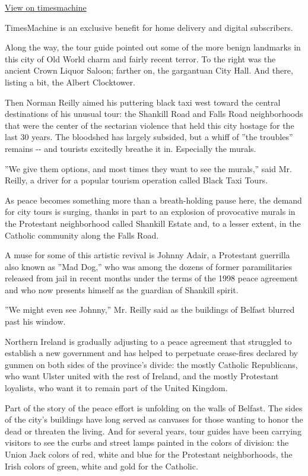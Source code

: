 \href{http://timesmachine.nytimes.com/timesmachine/2000/08/12/640697.html}{View
on timesmachine}

TimesMachine is an exclusive benefit for home delivery and digital
subscribers.

Along the way, the tour guide pointed out some of the more benign
landmarks in this city of Old World charm and fairly recent terror. To
the right was the ancient Crown Liquor Saloon; farther on, the
gargantuan City Hall. And there, listing a bit, the Albert Clocktower.

Then Norman Reilly aimed his puttering black taxi west toward the
central destinations of his unusual tour: the Shankill Road and Falls
Road neighborhoods that were the center of the sectarian violence that
held this city hostage for the last 30 years. The bloodshed has largely
subsided, but a whiff of ''the troubles'' remains -\/- and tourists
excitedly breathe it in. Especially the murals.

''We give them options, and most times they want to see the murals,''
said Mr. Reilly, a driver for a popular tourism operation called Black
Taxi Tours.

As peace becomes something more than a breath-holding pause here, the
demand for city tours is surging, thanks in part to an explosion of
provocative murals in the Protestant neighborhood called Shankill Estate
and, to a lesser extent, in the Catholic community along the Falls Road.

A muse for some of this artistic revival is Johnny Adair, a Protestant
guerrilla also known as ''Mad Dog,'' who was among the dozens of former
paramilitaries released from jail in recent months under the terms of
the 1998 peace agreement and who now presents himself as the guardian of
Shankill spirit.

''We might even see Johnny,'' Mr. Reilly said as the buildings of
Belfast blurred past his window.

Northern Ireland is gradually adjusting to a peace agreement that
struggled to establish a new government and has helped to perpetuate
cease-fires declared by gunmen on both sides of the province's divide:
the mostly Catholic Republicans, who want Ulster united with the rest of
Ireland, and the mostly Protestant loyalists, who want it to remain part
of the United Kingdom.

Part of the story of the peace effort is unfolding on the walls of
Belfast. The sides of the city's buildings have long served as canvases
for those wanting to honor the dead or threaten the living. And for
several years, tour guides have been carrying visitors to see the curbs
and street lamps painted in the colors of division: the Union Jack
colors of red, white and blue for the Protestant neighborhoods, the
Irish colors of green, white and gold for the Catholic.

